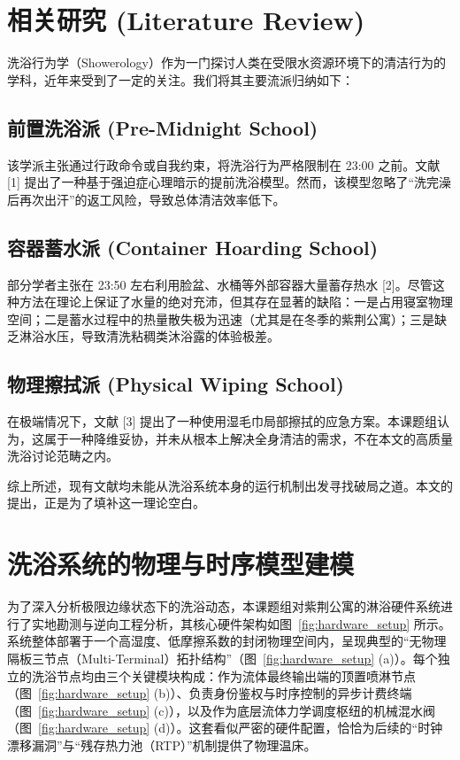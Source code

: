 ﻿\documentclass[10pt, conference, a4paper]{IEEEtran}
\begin{document}
\section{相关研究 (Literature Review)}
洗浴行为学（Showerology）作为一门探讨人类在受限水资源环境下的清洁行为的学科，近年来受到了一定的关注。我们将其主要流派归纳如下：

\subsection{前置洗浴派 (Pre-Midnight School)}
该学派主张通过行政命令或自我约束，将洗浴行为严格限制在 23:00 之前。文献 [1] 提出了一种基于强迫症心理暗示的提前洗浴模型。然而，该模型忽略了“洗完澡后再次出汗”的返工风险，导致总体清洁效率低下。

\subsection{容器蓄水派 (Container Hoarding School)}
部分学者主张在 23:50 左右利用脸盆、水桶等外部容器大量蓄存热水 [2]。尽管这种方法在理论上保证了水量的绝对充沛，但其存在显著的缺陷：一是占用寝室物理空间；二是蓄水过程中的热量散失极为迅速（尤其是在冬季的紫荆公寓）；三是缺乏淋浴水压，导致清洗粘稠类沐浴露的体验极差。

\subsection{物理擦拭派 (Physical Wiping School)}
在极端情况下，文献 [3] 提出了一种使用湿毛巾局部擦拭的应急方案。本课题组认为，这属于一种降维妥协，并未从根本上解决全身清洁的需求，不在本文的高质量洗浴讨论范畴之内。

综上所述，现有文献均未能从洗浴系统本身的运行机制出发寻找破局之道。本文的提出，正是为了填补这一理论空白。

\section{洗浴系统的物理与时序模型建模}

为了深入分析极限边缘状态下的洗浴动态，本课题组对紫荆公寓的淋浴硬件系统进行了实地勘测与逆向工程分析，其核心硬件架构如图~\ref{fig:hardware_setup} 所示。系统整体部署于一个高湿度、低摩擦系数的封闭物理空间内，呈现典型的“无物理隔板三节点（Multi-Terminal）拓扑结构”（图~\ref{fig:hardware_setup} (a)）。每个独立的洗浴节点均由三个关键模块构成：作为流体最终输出端的顶置喷淋节点（图~\ref{fig:hardware_setup} (b)）、负责身份鉴权与时序控制的异步计费终端（图~\ref{fig:hardware_setup} (c)），以及作为底层流体力学调度枢纽的机械混水阀（图~\ref{fig:hardware_setup} (d)）。这套看似严密的硬件配置，恰恰为后续的“时钟漂移漏洞”与“残存热力池（RTP）”机制提供了物理温床。
\end{document}
